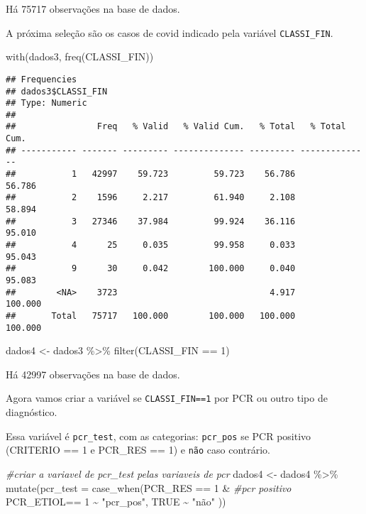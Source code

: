 \documentclass[
]{article}
\newenvironment{Shaded}{\begin{snugshade}}{\end{snugshade}}
\newcommand{\AttributeTok}[1]{\textcolor[rgb]{0.77,0.63,0.00}{#1}}
\newcommand{\CommentTok}[1]{\textcolor[rgb]{0.56,0.35,0.01}{\textit{#1}}}
\newcommand{\ConstantTok}[1]{\textcolor[rgb]{0.00,0.00,0.00}{#1}}
\newcommand{\DecValTok}[1]{\textcolor[rgb]{0.00,0.00,0.81}{#1}}
\newcommand{\FunctionTok}[1]{\textcolor[rgb]{0.00,0.00,0.00}{#1}}
\newcommand{\NormalTok}[1]{#1}
\newcommand{\OtherTok}[1]{\textcolor[rgb]{0.56,0.35,0.01}{#1}}
\newcommand{\SpecialCharTok}[1]{\textcolor[rgb]{0.00,0.00,0.00}{#1}}
\newcommand{\StringTok}[1]{\textcolor[rgb]{0.31,0.60,0.02}{#1}}
\begin{document}
Há 75717 observações na base de dados.

A próxima seleção são os casos de covid indicado pela variável
\texttt{CLASSI\_FIN}.

\begin{Shaded}
\begin{Highlighting}[]
\FunctionTok{with}\NormalTok{(dados3, }\FunctionTok{freq}\NormalTok{(CLASSI\_FIN))}
\end{Highlighting}
\end{Shaded}

\begin{verbatim}
## Frequencies  
## dados3$CLASSI_FIN  
## Type: Numeric  
## 
##                Freq   % Valid   % Valid Cum.   % Total   % Total Cum.
## ----------- ------- --------- -------------- --------- --------------
##           1   42997    59.723         59.723    56.786         56.786
##           2    1596     2.217         61.940     2.108         58.894
##           3   27346    37.984         99.924    36.116         95.010
##           4      25     0.035         99.958     0.033         95.043
##           9      30     0.042        100.000     0.040         95.083
##        <NA>    3723                              4.917        100.000
##       Total   75717   100.000        100.000   100.000        100.000
\end{verbatim}

\begin{Shaded}
\begin{Highlighting}[]
\NormalTok{dados4 }\OtherTok{\textless{}{-}}\NormalTok{ dados3 }\SpecialCharTok{\%\textgreater{}\%} 
  \FunctionTok{filter}\NormalTok{(CLASSI\_FIN }\SpecialCharTok{==} \DecValTok{1}\NormalTok{)}
\end{Highlighting}
\end{Shaded}

Há 42997 observações na base de dados.

Agora vamos criar a variável se \texttt{CLASSI\_FIN==1} por PCR ou outro
tipo de diagnóstico.

Essa variável é \texttt{pcr\_test}, com as categorias: \texttt{pcr\_pos}
se PCR positivo (CRITERIO == 1 e PCR\_RES == 1) e \texttt{não} caso
contrário.

\begin{Shaded}
\begin{Highlighting}[]
\CommentTok{\#criar a variavel de pcr\_test pelas variaveis de pcr}
\NormalTok{dados4 }\OtherTok{\textless{}{-}}\NormalTok{ dados4 }\SpecialCharTok{\%\textgreater{}\%}
  \FunctionTok{mutate}\NormalTok{(}\AttributeTok{pcr\_test =} \FunctionTok{case\_when}\NormalTok{(PCR\_RES }\SpecialCharTok{==} \DecValTok{1} \SpecialCharTok{\&} \CommentTok{\#pcr positivo }
\NormalTok{                                PCR\_ETIOL}\SpecialCharTok{==} \DecValTok{1}  \SpecialCharTok{\textasciitilde{}} \StringTok{"pcr\_pos"}\NormalTok{,}
                              \ConstantTok{TRUE} \SpecialCharTok{\textasciitilde{}} \StringTok{"não"}
\NormalTok{                              ))}
\end{Highlighting}
\end{Shaded}
\end{document}
